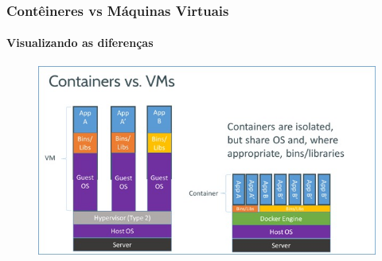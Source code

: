 \documentclass[12pt]{beamer}
\begin{document}
\begin{frame}
  \frametitle{Contêineres vs Máquinas Virtuais}
  \framesubtitle{Visualizando as diferenças}
  \begin{block}{}
    \begin{figure}[!h]
      \centering
      \includegraphics[width=0.6\paperwidth]{vmvscontainer}
    \end{figure}
  \end{block}
\end{frame}
\end{document}
